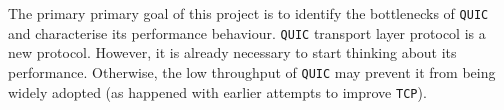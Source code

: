 \documentclass[12pt,a4paper,twoside,openright]{report}
\begin{document}
The primary primary goal of this project is to identify the bottlenecks of \texttt{QUIC} and characterise its performance behaviour.
\texttt{QUIC} transport layer protocol is a new protocol.
However, it is already necessary to start thinking about its performance.
Otherwise, the low throughput of \texttt{QUIC} may prevent it from being widely adopted (as happened with earlier attempts to improve \texttt{TCP}). 










 
 
 
\end{document}
